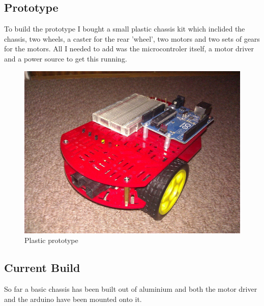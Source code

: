 \documentclass[11pt,fleqn,twoside]{article}
\begin{document}
\subsection{Prototype}
To build the prototype I bought a small plastic chassis kit which inclided the chassis, two wheels, a caster for the rear 'wheel', two motors and two sets of gears for the motors.  All I needed to add was the microcontroler itself, a motor driver and a power source to get this running.
\begin{figure}[h]
\centering
        \includegraphics[width=5.0in] {figures/tria-mkI.jpg}
        \caption{Plastic prototype}
        \label{Plastic prototype}
\end{figure}

\subsection{Current Build}
So far a basic chassis has been built out of aluminium and both the motor driver and the arduino have been mounted onto it.
\end{document}
